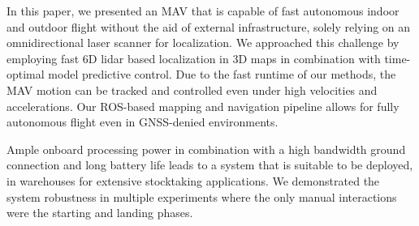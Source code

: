 In this paper, we presented an MAV that is capable of fast autonomous indoor and outdoor flight without the aid of external infrastructure, solely relying on an omnidirectional laser scanner for localization.
We approached this challenge by employing fast 6D lidar based localization in 3D maps in combination with time-optimal model predictive control. Due to the fast runtime of our methods, the MAV motion can be tracked and controlled even under high velocities and accelerations.
Our ROS-based mapping and navigation pipeline allows for fully autonomous flight even in GNSS-denied environments.

Ample onboard processing power in combination with a high bandwidth ground connection and long battery life leads to a system that is suitable to be deployed, \eg in warehouses for extensive stocktaking applications.
We demonstrated the system robustness in multiple experiments where the only manual interactions were the starting and landing phases.
